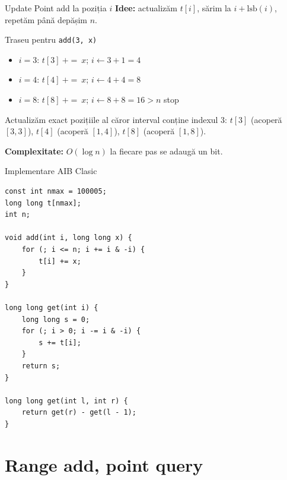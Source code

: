\documentclass[10pt]{beamer}
\begin{document}
\begin{frame}{Update \textemdash{} Point add la poziția $i$}
  \textbf{Idee:} actualizăm $t[i]$, sărim la $i + \text{lsb}(i)$, repetăm până depășim $n$.
  \begin{block}{Traseu pentru \texttt{add(3, x)}}
    \begin{itemize}\itemsep0pt
      \item $i=3$: $t[3]\ {+}{=}\ x$; $i \leftarrow 3+1 = 4$
      \item $i=4$: $t[4]\ {+}{=}\ x$; $i \leftarrow 4+4 = 8$
      \item $i=8$: $t[8]\ {+}{=}\ x$; $i \leftarrow 8+8 = 16 > n$ \textemdash{} stop
    \end{itemize}
  \end{block}
  \smallskip
  Actualizăm exact pozițiile al căror interval conține indexul 3:
  $t[3]$ (acoperă $[3,3]$), $t[4]$ (acoperă $[1,4]$), $t[8]$ (acoperă $[1,8]$).

  \textbf{Complexitate:} $O(\log n)$ \textemdash{} la fiecare pas se adaugă un bit.
\end{frame}

\begin{frame}[fragile]{Implementare AIB Clasic}
  \begin{lstlisting}
const int nmax = 100005;
long long t[nmax];
int n;

void add(int i, long long x) {
    for (; i <= n; i += i & -i) {
        t[i] += x;
    }
}

long long get(int i) {
    long long s = 0;
    for (; i > 0; i -= i & -i) {
        s += t[i];
    }
    return s;
}

long long get(int l, int r) {
    return get(r) - get(l - 1);
}
  \end{lstlisting}
\end{frame}

\section{Range add, point query}
\end{document}
